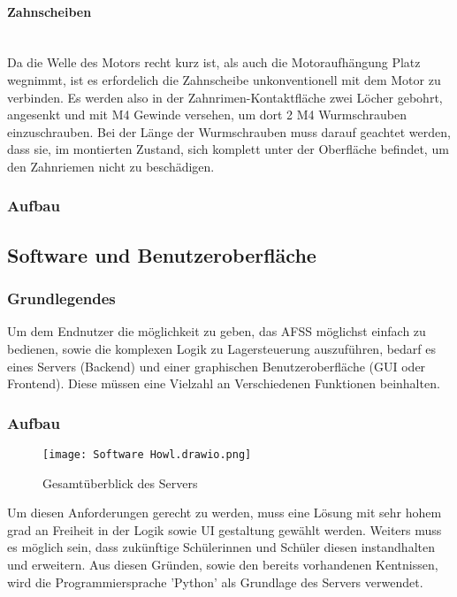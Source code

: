 \paragraph{Zahnscheiben}\mbox{}\\
Da die Welle des Motors recht kurz ist, als auch die Motoraufhängung Platz wegnimmt, ist es erfordelich die Zahnscheibe unkonventionell mit dem Motor zu verbinden. Es werden also in der Zahnrimen-Kontaktfläche zwei Löcher gebohrt, angesenkt und mit M4 Gewinde versehen, um dort 2 M4 Wurmschrauben einzuschrauben. Bei der Länge der Wurmschrauben muss darauf geachtet werden, dass sie, im montierten Zustand, sich komplett unter der Oberfläche befindet, um den Zahnriemen nicht zu beschädigen.

\subsubsection{Aufbau}


\newpage
\subsection{Software und Benutzeroberfläche}

\subsubsection{Grundlegendes}
Um dem Endnutzer die möglichkeit zu geben, das AFSS möglichst einfach zu bedienen, sowie die komplexen Logik zu Lagersteuerung auszuführen, bedarf es eines Servers (Backend) und einer graphischen Benutzeroberfläche (GUI oder Frontend). Diese müssen eine Vielzahl an Verschiedenen Funktionen beinhalten.

\subsubsection{Aufbau}
\begin{figure}[h]
    \texttt{[image: Software Howl.drawio.png]}
    \caption{Gesamtüberblick des Servers}
\end{figure}

Um diesen Anforderungen gerecht zu werden, muss eine Lösung mit sehr hohem grad an Freiheit in der Logik sowie UI gestaltung gewählt werden. Weiters muss es möglich sein, dass zukünftige Schülerinnen und Schüler diesen instandhalten und erweitern. Aus diesen Gründen, sowie den bereits vorhandenen Kentnissen, wird die Programmiersprache 'Python' als Grundlage des Servers verwendet.

